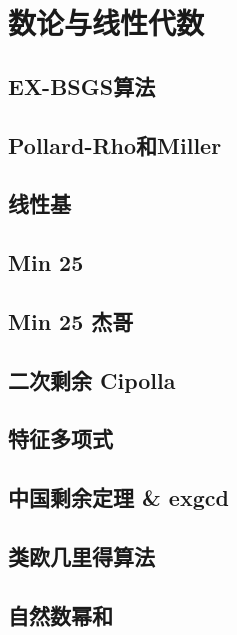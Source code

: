 \documentclass[a4paper,12pt]{article}
\begin{document}
\section{数论与线性代数}

\subsection{EX-BSGS算法}

\subsection{Pollard-Rho和Miller}

\subsection{线性基}


\subsection{Min 25}

\subsection{Min 25 杰哥}

\subsection{二次剩余 Cipolla}

\subsection{特征多项式}

\subsection{中国剩余定理 \& exgcd}

\subsection{类欧几里得算法}

\subsection{自然数幂和}

\end{document}
